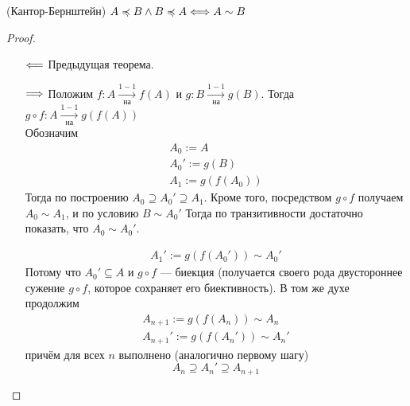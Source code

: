 \begin{theorem}(Кантор-Бернштейн)
    $A \preccurlyeq B \wedge B \preccurlyeq A \Longleftrightarrow A \sim B$
\end{theorem}
\begin{proof}
    \enewline
    \begin{itemize}
        \item[$\Longleftarrow$] Предыдущая теорема.
        \item[$\Longrightarrow$] Положим $f \colon A \xrightarrow[\text{на}]{1-1} f(A)$ и
        $g \colon B \xrightarrow[\text{на}]{1-1} g(B)$.
        Тогда $g \circ f \colon A \xrightarrow[\text{на}]{1-1} g(f(A))$ \\
        Обозначим
        \begin{gather*}
            A_0 := A \\
            A_0' := g(B) \\
            A_1 := g(f(A_0))
        \end{gather*}
        Тогда по построению $A_0 \supseteq A_0' \supseteq A_1$. Кроме того,
        посредством $g \circ f$ получаем $A_0 \sim A_1$, и по условию $B \sim
        A_0'$ Тогда по транзитивности достаточно показать, что $A_0 \sim A_0'$.

        \begin{gather*}
            A_1' := g(f(A_0')) \sim A_0'
        \end{gather*}
        Потому что $A_0' \subseteq A$ и $g \circ f$ --- биекция (получается своего рода двустороннее сужение $g \circ f$, которое сохраняет его биективность). В том же духе продолжим
        \begin{gather*}
            A_{n+1} := g(f(A_n)) \sim A_n \\
            A_{n+1}' := g(f(A_n')) \sim A_n'
        \end{gather*}
        причём для всех $n$ выполнено (аналогично первому шагу)
\[
        A_n \supseteq A_n' \supseteq A_{n+1}
\]


\end{itemize}
\end{proof}
